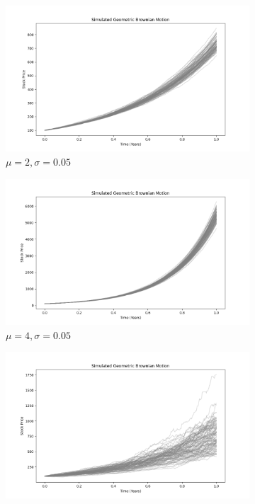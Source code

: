 \begin{figure}[H]
    \centering
    \begin{subfigure}[b]{0.495\textwidth}
        \centering
        \includegraphics[width=\textwidth]{figures/gbm_plot_1.png}
        \caption{$\mu = 2, \sigma = 0.05$}
        \label{fig:gbm-sample-path-1}
    \end{subfigure}
    \hfill
    \begin{subfigure}[b]{0.495\textwidth}
        \centering
        \includegraphics[width=\textwidth]{figures/gbm_plot_2.png}
        \caption{$\mu = 4, \sigma = 0.05$}
        \label{fig:gbm-sample-path-2}
    \end{subfigure}
    \begin{subfigure}[c]{0.495\textwidth}
        \centering
        \includegraphics[width=\textwidth]{figures/gbm_plot_3.png}

\end{subfigure}
\end{figure}

